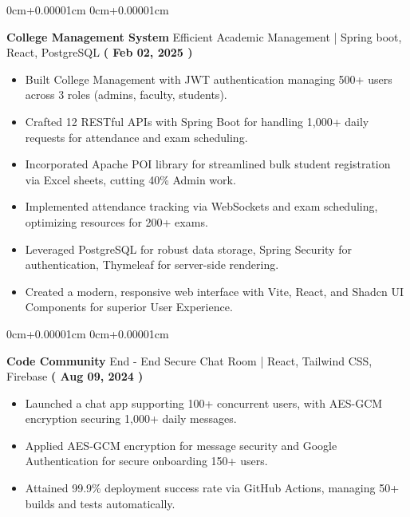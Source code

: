\documentclass[10pt,a4paper]{article}
\newenvironment{highlights}{
    \begin{itemize}[
        topsep=0.10cm,
        parsep=0.10cm,
        partopsep=0pt,
        itemsep=0pt,
        leftmargin=0cm+10pt
    ]
    }{
    \end{itemize}
}
\newenvironment{onecolentry}{
    \begin{adjustwidth}{
        0cm+0.00001cm
    }{
        0cm+0.00001cm
    }
    }{
    \end{adjustwidth}
}
\begin{document}
    \begin{onecolentry}
        \textbf{College Management System} Efficient Academic Management | Spring boot, React, PostgreSQL \hfill \textbf{( Feb 02, 2025 )} \\
        \begin{highlights}
            \item Built College Management with JWT authentication  managing 500+ users across 3 roles (admins, faculty, students). \\
            \item Crafted 12 RESTful APIs with Spring Boot for handling 1,000+ daily requests for attendance and exam scheduling. \\
            \item Incorporated Apache POI library for streamlined bulk student registration via Excel sheets, cutting 40\% Admin work. \\
            \item Implemented attendance tracking via WebSockets and exam scheduling, optimizing resources for 200+ exams. \\
            \item Leveraged PostgreSQL for robust data storage, Spring Security for authentication, Thymeleaf for server-side rendering. \\
            \item Created a modern, responsive web interface with Vite, React, and Shadcn UI Components for superior User Experience. \\
        \end{highlights}
    \end{onecolentry}
    \vspace{0.01cm}
    \begin{onecolentry}
        \textbf{Code Community} End - End Secure Chat Room | React, Tailwind CSS, Firebase \hfill \textbf{( Aug 09, 2024 )} \\
        \begin{highlights}
            \item Launched a chat app supporting 100+ concurrent users, with AES-GCM encryption securing 1,000+ daily messages. \\
            \item Applied AES-GCM encryption for message security and Google Authentication for secure onboarding 150+ users. \\
            \item Attained 99.9\% deployment success rate via GitHub Actions, managing 50+ builds and tests automatically.
        \end{highlights}
    \end{onecolentry}
\end{document}
